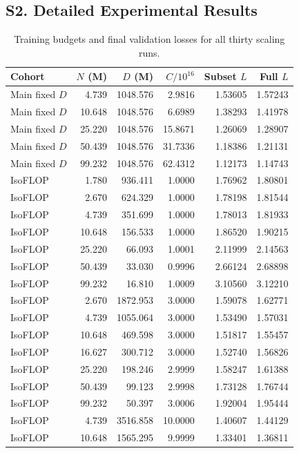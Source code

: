 \documentclass{article}
\begin{document}
\subsection*{S2. Detailed Experimental Results}
\normalsize\renewcommand{\arraystretch}{1.45}
\begin{longtable}{lrrrrr}
\caption{Training budgets and final validation losses for all thirty scaling runs.}\label{tab:all-runs}\\[7pt]
\toprule Cohort & $N$ (M) & $D$ (M) & $C/10^{16}$ & Subset $L$ & Full $L$\\\midrule
Main fixed $D$ & 4.739 & 1048.576 & 2.9816 & 1.53605 & 1.57243\\
Main fixed $D$ & 10.648 & 1048.576 & 6.6989 & 1.38293 & 1.41978\\
Main fixed $D$ & 25.220 & 1048.576 & 15.8671 & 1.26069 & 1.28907\\
Main fixed $D$ & 50.439 & 1048.576 & 31.7336 & 1.18386 & 1.21131\\
Main fixed $D$ & 99.232 & 1048.576 & 62.4312 & 1.12173 & 1.14743\\
IsoFLOP & 1.780 & 936.411 & 1.0000 & 1.76962 & 1.80801\\
IsoFLOP & 2.670 & 624.329 & 1.0000 & 1.78198 & 1.81544\\
IsoFLOP & 4.739 & 351.699 & 1.0000 & 1.78013 & 1.81933\\
IsoFLOP & 10.648 & 156.533 & 1.0000 & 1.86520 & 1.90215\\
IsoFLOP & 25.220 & 66.093 & 1.0001 & 2.11999 & 2.14563\\
IsoFLOP & 50.439 & 33.030 & 0.9996 & 2.66124 & 2.68898\\
IsoFLOP & 99.232 & 16.810 & 1.0009 & 3.10560 & 3.12210\\
IsoFLOP & 2.670 & 1872.953 & 3.0000 & 1.59078 & 1.62771\\
IsoFLOP & 4.739 & 1055.064 & 3.0000 & 1.53490 & 1.57031\\
IsoFLOP & 10.648 & 469.598 & 3.0000 & 1.51817 & 1.55457\\
IsoFLOP & 16.627 & 300.712 & 3.0000 & 1.52740 & 1.56826\\
IsoFLOP & 25.220 & 198.246 & 2.9999 & 1.58247 & 1.61388\\
IsoFLOP & 50.439 & 99.123 & 2.9998 & 1.73128 & 1.76744\\
IsoFLOP & 99.232 & 50.397 & 3.0006 & 1.92004 & 1.95444\\
IsoFLOP & 4.739 & 3516.858 & 10.0000 & 1.40607 & 1.44129\\
IsoFLOP & 10.648 & 1565.295 & 9.9999 & 1.33401 & 1.36811\\

\end{longtable}
\end{document}
